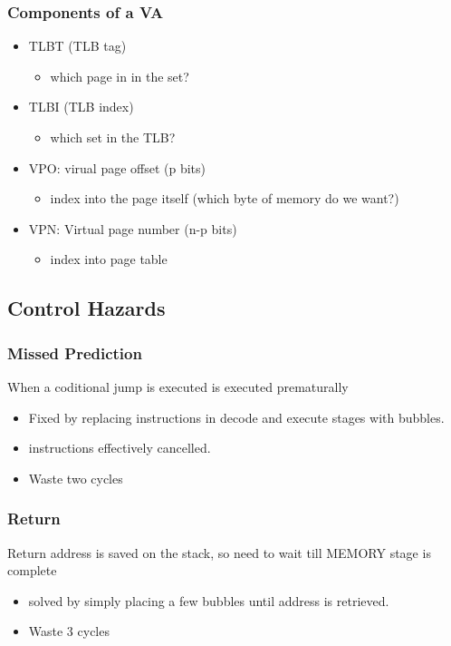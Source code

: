 \documentclass[11pt]{article}
\begin{document}
\subsubsection{Components of a VA}
\label{sec:orgheadline14}
\begin{itemize}
\item TLBT (TLB tag)
\begin{itemize}
\item which page in in the set?
\end{itemize}
\item TLBI (TLB index)
\begin{itemize}
\item which set in the TLB?
\end{itemize}
\item VPO: virual page offset (p bits)
\begin{itemize}
\item index into the page itself (which byte of memory do we want?)
\end{itemize}
\item VPN: Virtual page number  (n-p bits)
\begin{itemize}
\item index into page table
\end{itemize}
\end{itemize}
\subsection{Control Hazards}
\label{sec:orgheadline19}
\subsubsection{Missed Prediction}
\label{sec:orgheadline16}
When a coditional jump is executed is executed prematurally 
\begin{itemize}
\item Fixed by replacing instructions in decode and execute stages with bubbles.
\item instructions effectively cancelled.
\item Waste two cycles
\end{itemize}
\subsubsection{Return}
\label{sec:orgheadline17}
Return address is saved on the stack, so need to wait till MEMORY stage is complete
\begin{itemize}
\item solved by simply placing a few bubbles until address is retrieved.
\item Waste 3 cycles
\end{itemize}
\end{document}
